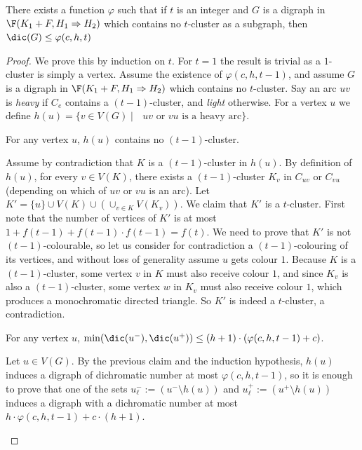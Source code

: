 \begin{lemma}\label{lemma:nocluster}
There exists a function $\varphi$ such that if $t$ is an integer and $G$ is a digraph in $\F( K_1+F, H_{1} \Rightarrow H_{2})$ which contains no $t$-cluster as a subgraph, then $\dic(G)\leq \varphi(c,h,t)$
\end{lemma}

\begin{proof}%
We prove this by induction on $t$. For $t=1$ the result is trivial as a $1$-cluster is simply a vertex. Assume the existence of $\varphi(c,h,t-1)$, and assume $G$ is a digraph in $\F( K_1+F, H_{1} \Rightarrow H_{2})$ which contains no $t$-cluster. Say an arc $uv$ is \emph{heavy} if $C_e$ contains a $(t-1)$-cluster, and \emph{light} otherwise. For a vertex $u$ we define $h(u)=\{v\in V(G) \mid \text{ $uv$ or $vu$ is a heavy arc}\}$. 

\begin{claim}
For any vertex $u$, $h(u)$ contains no $(t-1)$-cluster. 
\end{claim}

\begin{subproof}
Assume by contradiction that $K$ is a $(t-1)$-cluster in $h(u)$. By definition of $h(u)$, for every $v \in V(K)$, there exists a $(t-1)$-cluster $K_v$ in $C_{uv}$ or $C_{vu}$ (depending on which of $uv$ or $vu$ is an arc). Let $K'=\{u\}\cup V(K) \cup (\cup_{v\in K} V(K_v))$. We claim that $K'$ is a $t$-cluster. First note that the number of vertices of $K'$ is at most $1+f(t-1) +f(t-1) \cdot f(t-1)=f(t)$. We need to prove that $K'$ is not $(t-1)$-colourable, so let us consider for contradiction a $(t-1)$-colouring of its vertices, and without loss of generality assume $u$ gets colour $1$. Because $K$ is a $(t-1)$-cluster, some vertex $v$ in $K$ must also receive colour $1$, and since $K_v$ is also a $(t-1)$-cluster, some vertex $w$ in $K_v$ must also receive colour $1$, which produces a monochromatic directed triangle. So $K'$ is indeed a $t$-cluster, a contradiction. 
\end{subproof}

\begin{claim}
For any vertex $u$, $\min(\dic(u^{-}),\dic(u^{+})) \leq (h+1) \cdot (\varphi(c,h,t-1)+c)$.
\end{claim}

    
\begin{subproof}
    Let $u \in V(G)$. By the previous claim and the induction hypothesis, $h(u)$ induces a digraph of dichromatic number at most $\varphi(c,h,t-1)$, so it is enough to prove that one of the sets $u^-_{\ell}:=(u^{-}\setminus h(u))$ and $u^+_{\ell}:=(u^{+} \setminus h(u))$ induces a digraph with a dichromatic number at most $h \cdot \varphi(c,h,t-1)+c\cdot (h+1)$. 
    

\end{subproof}
\end{proof}
